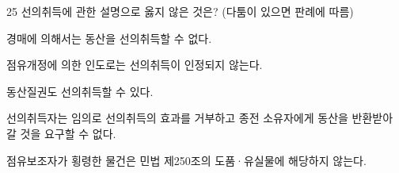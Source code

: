 \begin{question}{25}
선의취득에 관한 설명으로 옳지 않은 것은? (다툼이 있으면 판례에 따름)
\begin{choices}
  \item 경매에 의해서는 동산을 선의취득할 수 없다.
  \item 점유개정에 의한 인도로는 선의취득이 인정되지 않는다.
  \item 동산질권도 선의취득할 수 있다.
  \item 선의취득자는 임의로 선의취득의 효과를 거부하고 종전 소유자에게 동산을 반환받아 갈 것을 요구할 수 없다.
  \item 점유보조자가 횡령한 물건은 민법 제250조의 도품·유실물에 해당하지 않는다.
\end{choices}
\end{question}
